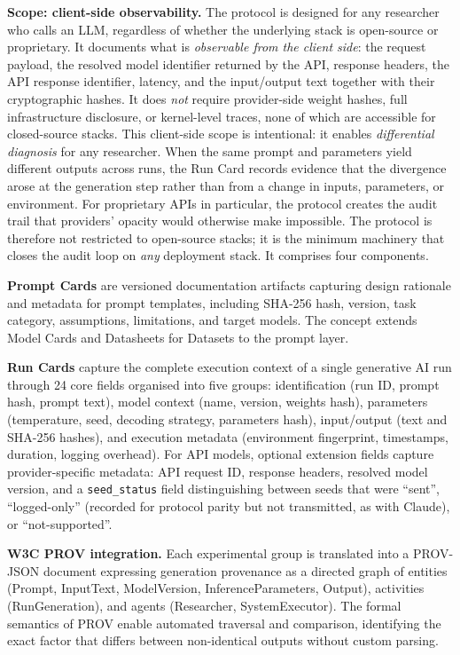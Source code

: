 \documentclass[sn-nature]{sn-jnl}
\begin{document}
\textbf{Scope: client-side observability.}
The protocol is designed for any researcher who calls an LLM, regardless of whether the underlying stack is open-source or proprietary.
It documents what is \emph{observable from the client side}: the request payload, the resolved model identifier returned by the API, response headers, the API response identifier, latency, and the input/output text together with their cryptographic hashes.
It does \emph{not} require provider-side weight hashes, full infrastructure disclosure, or kernel-level traces, none of which are accessible for closed-source stacks.
This client-side scope is intentional: it enables \emph{differential diagnosis} for any researcher.
When the same prompt and parameters yield different outputs across runs, the Run Card records evidence that the divergence arose at the generation step rather than from a change in inputs, parameters, or environment.
For proprietary APIs in particular, the protocol creates the audit trail that providers' opacity would otherwise make impossible.
The protocol is therefore not restricted to open-source stacks; it is the minimum machinery that closes the audit loop on \emph{any} deployment stack.
It comprises four components.

\textbf{Prompt Cards} are versioned documentation artifacts capturing design rationale and metadata for prompt templates, including SHA-256 hash, version, task category, assumptions, limitations, and target models.
The concept extends Model Cards\cite{mitchell2019model} and Datasheets for Datasets\cite{gebru2021datasheets} to the prompt layer.

\textbf{Run Cards} capture the complete execution context of a single generative AI run through 24 core fields organised into five groups: identification (run ID, prompt hash, prompt text), model context (name, version, weights hash), parameters (temperature, seed, decoding strategy, parameters hash), input/output (text and SHA-256 hashes), and execution metadata (environment fingerprint, timestamps, duration, logging overhead).
For API models, optional extension fields capture provider-specific metadata: API request ID, response headers, resolved model version, and a \texttt{seed\_status} field distinguishing between seeds that were ``sent'', ``logged-only'' (recorded for protocol parity but not transmitted, as with Claude), or ``not-supported''.

\textbf{W3C PROV integration.}
Each experimental group is translated into a PROV-JSON document\cite{w3cprov2013} expressing generation provenance as a directed graph of entities (Prompt, InputText, ModelVersion, InferenceParameters, Output), activities (RunGeneration), and agents (Researcher, SystemExecutor).
The formal semantics of PROV enable automated traversal and comparison, identifying the exact factor that differs between non-identical outputs without custom parsing.
\end{document}
